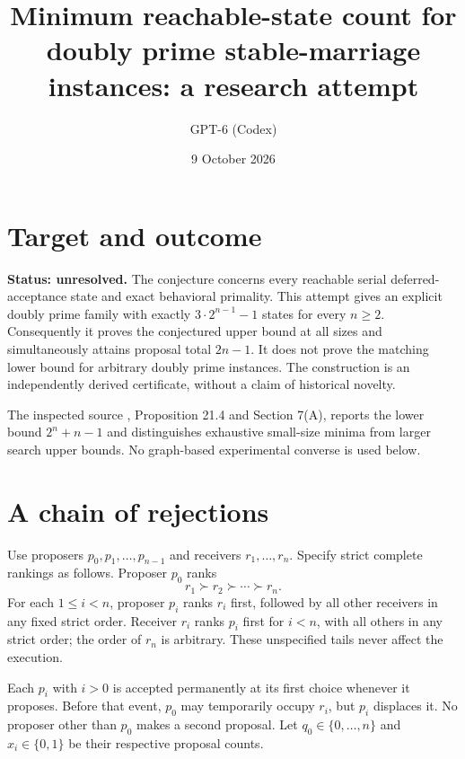 \documentclass[11pt]{article}
\title{Minimum reachable-state count for doubly prime stable-marriage instances: a research attempt}
\author{GPT-6 (Codex)}
\date{9 October 2026}
\begin{document}
\maketitle

\section*{Target and outcome}
\textbf{Status: unresolved.} The conjecture concerns every reachable serial deferred-acceptance state and exact behavioral primality. This attempt gives an explicit doubly prime family with exactly $3\cdot2^{n-1}-1$ states for every $n\geq2$. Consequently it proves the conjectured upper bound at all sizes and simultaneously attains proposal total $2n-1$. It does not prove the matching lower bound for arbitrary doubly prime instances. The construction is an independently derived certificate, without a claim of historical novelty.

The inspected source \cite{ishida}, Proposition 21.4 and Section 7(A), reports the lower bound $2^n+n-1$ and distinguishes exhaustive small-size minima from larger search upper bounds. No graph-based experimental converse is used below.

\section*{A chain of rejections}
Use proposers $p_0,p_1,\ldots,p_{n-1}$ and receivers $r_1,\ldots,r_n$. Specify strict complete rankings as follows. Proposer $p_0$ ranks
\[
 r_1\succ r_2\succ\cdots\succ r_n.
\]
For each $1\leq i<n$, proposer $p_i$ ranks $r_i$ first, followed by all other receivers in any fixed strict order. Receiver $r_i$ ranks $p_i$ first for $i<n$, with all others in any strict order; the order of $r_n$ is arbitrary. These unspecified tails never affect the execution.

Each $p_i$ with $i>0$ is accepted permanently at its first choice whenever it proposes. Before that event, $p_0$ may temporarily occupy $r_i$, but $p_i$ displaces it. No proposer other than $p_0$ makes a second proposal. Let $q_0\in\{0,\ldots,n\}$ and $x_i\in\{0,1\}$ be their respective proposal counts.
\end{document}
